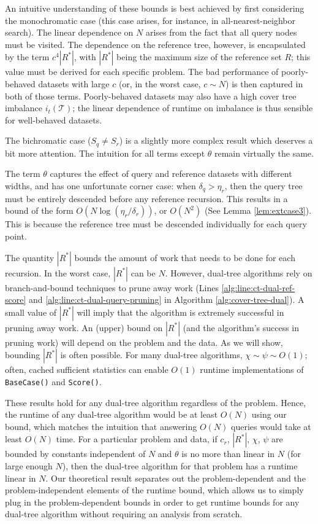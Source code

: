 An intuitive understanding of these bounds is best achieved by first considering
the monochromatic case (this case arises, for instance, in all-nearest-neighbor
search).  The linear dependence on $N$ arises from the fact that all query nodes
must be visited.  The dependence on the reference tree, however, is encapsulated
by the term $c^4 |R^*|$, with $|R^*|$ being the maximum size of the reference
set $R$; this value must be derived for each specific problem.  The bad
performance of poorly-behaved datasets with large $c$ (or, in the worst case, $c
\sim N$) is then captured in both of those terms.  Poorly-behaved datasets may
also have a high cover tree imbalance $i_t(\mathscr{T})$; the linear dependence of
runtime on imbalance is thus sensible for well-behaved datasets.

The bichromatic case ($S_q \ne S_r$) is a slightly more complex result which
deserves a bit more attention.  The intuition for all terms except $\theta$
remain virtually the same.

The term $\theta$ captures the effect of query and reference datasets with
different widths, and has one unfortunate corner case: when $\delta_q > \eta_r$,
then the query tree must be entirely descended before any reference recursion.
This results in a bound of the form $O(N \log (\eta_r / \delta_r))$, or
$O(N^2)$ (See Lemma \ref{lem:extcase3}).  This is because the reference tree
must be descended individually for each query point.

The quantity $|R^*|$ bounds the amount of work that needs to be done for each
recursion. In the worst case, $|R^*|$ can be $N$. However,
dual-tree algorithms rely on branch-and-bound techniques to prune away
work (Lines \ref{alg:line:ct-dual-ref-score} and
\ref{alg:line:ct-dual-query-pruning} in Algorithm \ref{alg:cover-tree-dual}). A
small value of $|R^*|$ will imply that the algorithm is extremely successful in
pruning away work.  An (upper) bound on $|R^*|$ (and the algorithm's
success in pruning work) will depend on the problem and the data.  As we will
show, bounding $|R^*|$ is often possible. %
For many dual-tree algorithms, $\chi \sim \psi \sim O(1)$; often, cached
sufficient statistics \citep{moore2000anchors} can enable $O(1)$ runtime
implementations of \texttt{BaseCase()} and \texttt{Score()}.

These results hold for any dual-tree algorithm regardless of the problem. Hence,
the runtime of any dual-tree algorithm
would be at least $O(N)$ using our bound, which matches the intuition that
answering $O(N)$ queries would take at least $O(N)$ time. For a particular
problem and data, if $c_r$, $|R^*|$, $\chi$, $\psi$ are bounded by constants
independent of $N$ and $\theta$ is no more than linear in $N$ (for large enough
$N$), then the dual-tree algorithm for that problem has a runtime linear in $N$.
Our theoretical result separates out the problem-dependent and the
problem-independent elements of the runtime bound, which allows us to simply
plug in the problem-dependent bounds in order to get runtime bounds for any
dual-tree algorithm without requiring an analysis from scratch.

